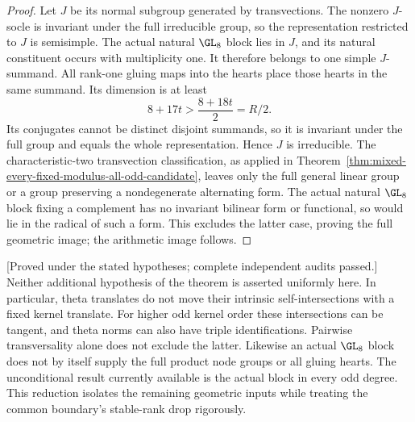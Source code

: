 \begin{proof}
Let $J$ be its normal subgroup generated by transvections.
The nonzero $J$-socle is invariant under the full irreducible group,
so the representation restricted to $J$ is semisimple.
The actual natural $\GL_8$ block lies in $J$, and its natural
constituent occurs with multiplicity one. It therefore belongs to
one simple $J$-summand. All rank-one gluing maps into the hearts
place those hearts in the same summand. Its dimension is at least
\[
                       8+17t>\frac{8+18t}{2}=R/2.
\]
Its conjugates cannot be distinct disjoint summands, so it is
invariant under the full group and equals the whole representation.
Hence $J$ is irreducible. The characteristic-two transvection
classification, as applied in
Theorem~\ref{thm:mixed-every-fixed-modulus-all-odd-candidate}, leaves
only the full general linear group or a group preserving a
nondegenerate alternating form. The actual natural $\GL_8$ block
fixing a complement has no invariant bilinear form or functional,
so would lie in the radical of such a form. This excludes the latter
case, proving the full geometric image; the arithmetic image follows.
\end{proof}

\begin{remark}
\label{rem:three-theta-conditional-geometric-gates-candidate}
\textup{[Proved under the stated hypotheses; complete independent audits passed.]}
Neither additional hypothesis of the theorem is asserted uniformly
here. In particular, theta translates do not move their intrinsic
self-intersections with a fixed kernel translate. For higher odd
kernel order these intersections can be tangent, and theta norms
can also have triple identifications. Pairwise transversality alone
does not exclude the latter. Likewise an actual $\GL_8$ block does
not by itself supply the full product node groups or all gluing
hearts. The unconditional result currently available is the actual
block in every odd degree. This reduction isolates the remaining
geometric inputs while treating the common boundary's stable-rank
drop rigorously.
\end{remark}
